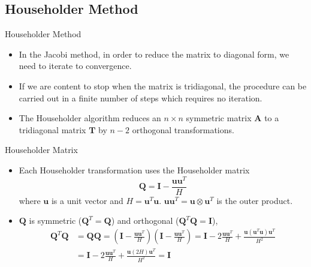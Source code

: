 \documentclass{beamer}
\begin{document}
\subsection[Householder Method]{Householder Method}
\begin{frame}{Householder Method}
    \begin{itemize}
        \item In the Jacobi method, in order to reduce the matrix to diagonal form, we need to iterate to convergence. 
        \item If we are content to stop when the matrix is tridiagonal,  the procedure can be carried out in a finite number
        of steps which requires no iteration.
        \item The Householder algorithm reduces an $n\times n$ symmetric matrix $\mathbf{A}$ to a tridiagonal matrix $\mathbf{T}$ by $n-2$ orthogonal transformations.
    \end{itemize}
\end{frame}
\begin{frame}{Householder Matrix}
    \begin{itemize}
        \item Each Householder transformation uses the Householder matrix
        \[
            \mathbf{Q}=\mathbf{I}-\frac{\mathbf{u} \mathbf{u}^T}{H}
        \] 
        where $\mathbf{u}$ is a unit vector and $H=\mathbf{u}^T \mathbf{u}$. $\mathbf{u} \mathbf{u}^T= \mathbf{u}\otimes \mathbf{u}^T$ is the outer product. 
        \item $\mathbf{Q}$ is symmetric ($\mathbf{Q}^T=\mathbf{Q}$) and orthogonal ($\mathbf{Q}^T \mathbf{Q}=\mathbf{I}$),
        \begin{align*}
            \mathbf{Q}^T \mathbf{Q} & =\mathbf{Q} \mathbf{Q}=\left(\mathbf{I}-\frac{\mathbf{u} \mathbf{u}^T}{H}\right)\left(\mathbf{I}-\frac{\mathbf{u} \mathbf{u}^T}{H}\right)=\mathbf{I}-2 \frac{\mathbf{u} \mathbf{u}^T}{H}+\frac{\mathbf{u}\left(\mathbf{u}^T \mathbf{u}\right) \mathbf{u}^T}{H^2} \\
            & =\mathbf{I}-2 \frac{\mathbf{u u}^T}{H}+\frac{\mathbf{u}(2 H) \mathbf{u}^T}{H^2}=\mathbf{I}
        \end{align*}
    \end{itemize}
\end{frame}
\end{document}
